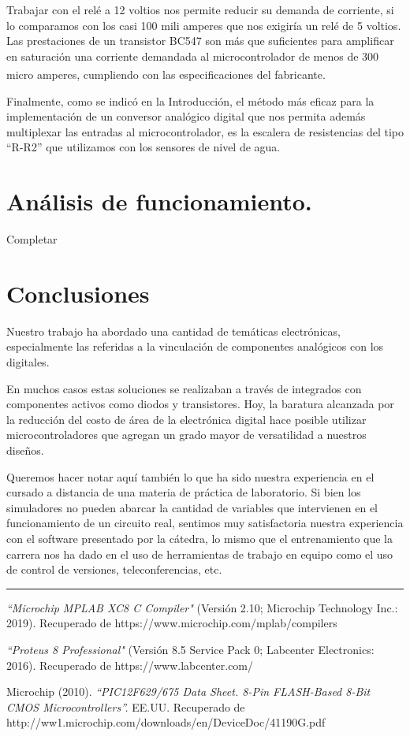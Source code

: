 ﻿\documentclass[a4paper]{article}
\let\originalcite\cite
\renewcommand{\cite}[2][]{\textsuperscript{\originalcite{#2}}}
\begin{document}
Trabajar con el relé a 12 voltios nos permite reducir 
su demanda de corriente, si lo comparamos con los casi 
100 mili amperes que nos exigiría un relé de 5 voltios. 
Las prestaciones de un transistor BC547 son más que 
suficientes para amplificar en saturación una corriente
demandada al microcontrolador de menos de 300 
micro amperes, cumpliendo con las especificaciones del
fabricante\cite{bib:datasheet}.

Finalmente, como se indicó en la Introducción, el método
más eficaz para la implementación de un conversor 
analógico digital que nos permita además multiplexar las
entradas al microcontrolador, es la escalera de 
resistencias del tipo ``R-R2'' que utilizamos con los 
sensores de nivel de agua.

\section{Análisis de funcionamiento.}

Completar

\section{Conclusiones}

Nuestro trabajo ha abordado una cantidad de temáticas 
electrónicas, especialmente las referidas a la vinculación
de componentes analógicos con los digitales.

En muchos casos estas soluciones se realizaban a través 
de integrados con componentes activos como
diodos y transistores. Hoy, la baratura alcanzada por 
la reducción del costo de área de la electrónica digital
hace posible utilizar microcontroladores que agregan un
grado mayor de versatilidad a nuestros diseños.

Queremos hacer notar aquí también lo que ha sido nuestra 
experiencia en el cursado a distancia de una materia de
práctica de laboratorio. Si bien los simuladores no pueden
abarcar la cantidad de variables que intervienen en el 
funcionamiento de un circuito real, sentimos muy 
satisfactoria nuestra experiencia con el software 
presentado por la cátedra, lo mismo que el entrenamiento 
que la carrera nos ha dado en el uso de herramientas de 
trabajo en equipo como el uso de control de versiones, 
teleconferencias, etc.

\noindent\rule{\textwidth}{1pt}

\begin{thebibliography}{9}

\textit{``Microchip MPLAB XC8 C Compiler"}
(Versión 2.10; Microchip Technology Inc.: 2019).
Recuperado de https://www.microchip.com/mplab/compilers

\textit{``Proteus 8 Professional"} 
(Versión 8.5 Service Pack 0; Labcenter Electronics: 2016).
Recuperado de https://www.labcenter.com/

Microchip (2010).
\textit{``PIC12F629/675 Data Sheet. 8-Pin FLASH-Based 8-Bit CMOS 
Microcontrollers''.}
EE.UU. Recuperado de 
http://ww1.microchip.com/downloads/en/DeviceDoc/41190G.pdf

\end{thebibliography}
\end{document}

